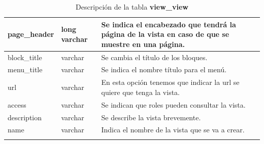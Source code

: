 \begin{center}
\begin{longtable}{|p{5.1cm}|p{3cm}|p{8.3cm}|}
 page\_header &  long varchar &  Se indica el encabezado que tendrá la página de la vista en caso de que se muestre en una página.\\ \hline

 block\_title & varchar &  Se cambia el título de los bloques.\\ \hline

 menu\_title & varchar &  Se indica el nombre título para el menú.\\ \hline

 url &  varchar &  En esta opción tenemos que indicar la url se quiere que tenga la vista.\\ \hline

 access &  varchar & Se indican que roles pueden consultar la vista.\\ \hline

 description &  varchar &  Se describe la vista brevemente.\\ \hline

 name &  varchar &  Indica el nombre de la vista que se va a crear.\\ \hline
\caption{Descripción de la tabla \textbf{view\_view}}
\end{longtable}
\end{center}
